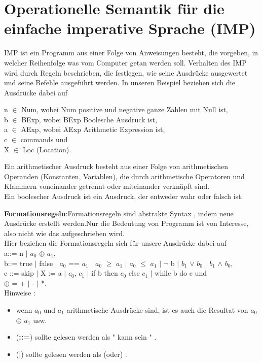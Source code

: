 \documentclass[a4paper,12pt,twoside,headsepline]{scrartcl}
\begin{document}
\section{Operationelle Semantik für die einfache imperative Sprache (IMP)}
IMP ist ein Programm aus einer Folge von Anweisungen besteht, die vorgeben, in welcher Reihenfolge was vom Computer getan werden soll.
 Verhalten des IMP  wird durch Regeln beschrieben, die festlegen, wie seine Ausdrücke ausgewertet und seine Befehle ausgeführt werden.
In unseren Beispiel beziehen sich die Ausdrücke dabei auf

n $\in$ Num, wobei Num positive und negative ganze Zahlen mit Null ist,\\
b $\in$ BExp, wobei BExp Boolesche Ausdruck ist,\\
a $\in$ AExp, wobei AExp Arithmetic Expression ist,\\
c $\in$ commands und\\
X $\in$ Loc    (Location).

Ein arithmetischer Ausdruck besteht aus einer Folge von arithmetischen Operanden (Konstanten, Variablen), die durch arithmetische Operatoren und Klammern voneinander getrennt oder miteinander verknüpft sind.\\ 
Ein boolescher Ausdruck ist ein Ausdruck, der entweder wahr oder falsch ist.


		
			
\textbf{Formationsregeln}:Formationsregeln sind abstrakte Syntax , indem neue Ausdrücke erstellt werden.Nur die Bedeutung von Programm ist von Interesse, also nicht wie  das aufgeschrieben wird.\\
Hier beziehen die Formationsregeln sich für unsere Ausdrücke dabei auf\\
	
a::= n $\mid$ $a_0$ $\oplus$ $a_1$,\\
b::= true $\mid$ false $\mid$ $a_0$ == $a_1$ $\mid$ $a_0$ $\geq$ $a_1$ $\mid$ $a_0$ $\leq$ $a_1$ $\mid$ $\neg$ b $\mid$ $b_1$ $\vee$ $b_0$ $\mid$ $b_1$ $\wedge$ $b_0$,\\   
c ::= skip $\mid$ X := a $\mid$  $c_0$, $c_1$ $\mid$ if b then $c_0$ else $c_1$ $\mid$ while b do c und \\
$\oplus$ = + $\mid$ - $\mid$ *.	\\
		
Hinweise :
\begin{itemize}
\item wenn $a_0$ und $a_1$ arithmetische Ausdrücke sind, ist es auch die Resultat von $a_0$ $\oplus$ $a_1$ usw. 
\item (\textbf{::=}) sollte gelesen werden als " kann sein " .
		\item (\textbf{$\mid$}) sollte gelesen werden als (oder) .
\end{itemize} 
\end{document}
